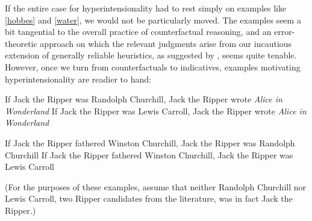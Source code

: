 \documentclass[If.tex]{subfiles}
\begin{document}
If the entire case for hyperintensionality had to rest simply on examples like \ref{hobbes} and \ref{water}, we would not be particularly moved.  The examples seem a bit tangential to the overall practice of counterfactual reasoning, and an error-theoretic approach on which the relevant judgments arise from our incautious extension of generally reliable heuristics, as suggested by \citet{WilliamsonCounterpossibls}, seems quite tenable.  However, once we turn from counterfactuals to indicatives, examples motivating hyperintensionality are readier to hand:  
\begin{prop}
	\nitem \label{ripper}
	\begin{prop}
		\aitem
		If Jack the Ripper was Randolph Churchill, Jack the Ripper wrote \emph{Alice in Wonderland}
		\aitem
		If Jack the Ripper was Lewis Carroll, Jack the Ripper wrote \emph{Alice in Wonderland}
	\end{prop}
	\nitem 
	\begin{prop}
		\aitem
		If Jack the Ripper fathered Winston Churchill, Jack the Ripper was Randolph Churchill
		\aitem
		If Jack the Ripper fathered Winston Churchill, Jack the Ripper was Lewis Carroll
	\end{prop}
\end{prop}
(For the purposes of these examples, assume that neither Randolph Churchill nor Lewis Carroll, two Ripper candidates from the literature, was in fact Jack the Ripper.)  
\end{document}

